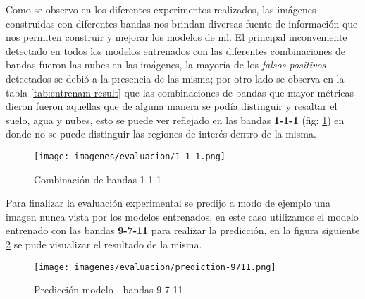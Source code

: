 Como se observo en los diferentes experimentos realizados, las imágenes construidas con diferentes bandas nos brindan diversas fuente de información que nos permiten construir y mejorar los modelos de \ac{ml}. El principal inconveniente detectado en todos los modelos entrenados con las diferentes combinaciones de bandas fueron las nubes en las imágenes, la mayoría de los \textit{falsos positivos} detectados se debió a la presencia de las misma; por otro lado se observa en la tabla \ref{tab:entrenam-result} que las combinaciones de bandas que mayor métricas dieron fueron aquellas que de alguna manera se podía distinguir y resaltar el suelo, agua y nubes, esto se puede ver reflejado en las bandas  \textbf{1-1-1} (fig: \ref{Fig:imagen_banda_111}) en donde no se puede distinguir las regiones de interés dentro de la misma. 
 
 \begin{figure}[H]\centering
  \texttt{[image: imagenes/evaluacion/1-1-1.png]}
  \caption{Combinación de bandas 1-1-1} \label{Fig:imagen_banda_111}
\end{figure}
 
Para finalizar la evaluación experimental se predijo a modo de ejemplo una imagen nunca vista por los modelos entrenados, en este caso utilizamos el modelo entrenado con las bandas \textbf{9-7-11} para realizar la predicción, en la figura siguiente  \ref{Fig: TP} se pude visualizar el resultado de la misma.

\begin{figure}[H]\centering
  \texttt{[image: imagenes/evaluacion/prediction-9711.png]}
  \caption{Predicción modelo - bandas 9-7-11} \label{Fig: TP}
\end{figure}














